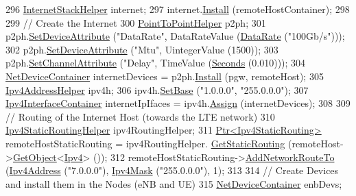 \begin{DoxyCode}
296   \hyperlink{classns3_1_1InternetStackHelper}{InternetStackHelper} internet;
297   internet.\hyperlink{classns3_1_1InternetStackHelper_a6645b412f31283d2d9bc3d8a95cebbc0}{Install} (remoteHostContainer);
298 
299   \textcolor{comment}{// Create the Internet}
300   \hyperlink{classns3_1_1PointToPointHelper}{PointToPointHelper} p2ph;
301   p2ph.\hyperlink{classns3_1_1PointToPointHelper_a4577f5ab8c387e5528af2e0fbab1152e}{SetDeviceAttribute} (\textcolor{stringliteral}{"DataRate"}, DataRateValue (\hyperlink{classns3_1_1DataRate}{DataRate} (\textcolor{stringliteral}{"100Gb/s"})));
302   p2ph.\hyperlink{classns3_1_1PointToPointHelper_a4577f5ab8c387e5528af2e0fbab1152e}{SetDeviceAttribute} (\textcolor{stringliteral}{"Mtu"}, UintegerValue (1500));
303   p2ph.\hyperlink{classns3_1_1PointToPointHelper_a6b5317fd17fb61e5a53f8d66a90b63b9}{SetChannelAttribute} (\textcolor{stringliteral}{"Delay"}, TimeValue (\hyperlink{group__timecivil_ga33c34b816f8ff6628e33d5c8e9713b9e}{Seconds} (0.010)));
304   \hyperlink{classns3_1_1NetDeviceContainer}{NetDeviceContainer} internetDevices = p2ph.\hyperlink{classns3_1_1PointToPointHelper_ab9162fea3e88722666fed1106df1f9ec}{Install} (pgw, remoteHost);
305   \hyperlink{classns3_1_1Ipv4AddressHelper}{Ipv4AddressHelper} ipv4h;
306   ipv4h.\hyperlink{classns3_1_1Ipv4AddressHelper_acf7b16dd25bac67e00f5e25f90a9a035}{SetBase} (\textcolor{stringliteral}{"1.0.0.0"}, \textcolor{stringliteral}{"255.0.0.0"});
307   \hyperlink{classns3_1_1Ipv4InterfaceContainer}{Ipv4InterfaceContainer} internetIpIfaces = ipv4h.\hyperlink{classns3_1_1Ipv4AddressHelper_af8e7f4a1a7e74c00014a1eac445a27af}{Assign} (internetDevices);
308 
309   \textcolor{comment}{// Routing of the Internet Host (towards the LTE network)}
310   \hyperlink{classns3_1_1Ipv4StaticRoutingHelper}{Ipv4StaticRoutingHelper} ipv4RoutingHelper;
311   \hyperlink{classns3_1_1Ptr}{Ptr<Ipv4StaticRouting>} remoteHostStaticRouting = ipv4RoutingHelper.
      \hyperlink{classns3_1_1Ipv4StaticRoutingHelper_a731206e50d305695dac7fb2ef963a4bb}{GetStaticRouting} (remoteHost->\hyperlink{classns3_1_1Object_a13e18c00017096c8381eb651d5bd0783}{GetObject}<\hyperlink{classns3_1_1Ipv4}{Ipv4}> ());
312   remoteHostStaticRouting->\hyperlink{classns3_1_1Ipv4StaticRouting_a8bf5eaa7ba49fe33c78c70d5560b6c39}{AddNetworkRouteTo} (\hyperlink{classns3_1_1Ipv4Address}{Ipv4Address} (\textcolor{stringliteral}{"7.0.0.0"}), 
      \hyperlink{classns3_1_1Ipv4Mask}{Ipv4Mask} (\textcolor{stringliteral}{"255.0.0.0"}), 1);
313 
314   \textcolor{comment}{// Create Devices and install them in the Nodes (eNB and UE)}
315   \hyperlink{classns3_1_1NetDeviceContainer}{NetDeviceContainer} enbDevs;

\end{DoxyCode}
